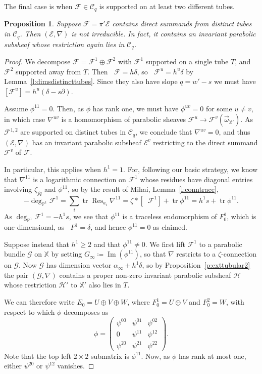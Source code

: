 \documentclass[12pt,a4paper]{amsart}
\theoremstyle{plain}
\newtheorem{prop}[thm]{Proposition}
\newcommand{\PP}{\mathbb P}
\DeclareMathOperator{\tr}{tr}
\DeclareMathOperator{\Ima}{Im}
\DeclareMathOperator{\Res}{Res}
\DeclareMathOperator{\dimv}{\underline\dim}
\newcommand{\F}{\mathcal F}
\newcommand{\E}{\mathcal E}
\newcommand{\G}{\mathcal G}
\newcommand{\CC}{\mathcal C}
\newcommand{\XX}{\mathbb X}
\newcommand{\oom}{\vec{\omega}}
\begin{document}
The final case is when $\F\in\CC_q$ is supported on at least two different tubes.

\begin{prop}
\label{p:exttubular3}
Suppose $\F=\pi'\E$ contains direct summands from distinct tubes in $\CC_q$. Then $(\E,\nabla)$ is not irreducible. In fact, it contains an invariant parabolic subsheaf whose restriction again lies in $\CC_q$.
\end{prop}

\begin{proof}
We decompose $\F=\F^1\oplus\F^2$ with $\F^1$ supported on a single tube $T$, and $\F^2$ supported away from $T$. Then $\dimv\F=h\delta$, so $\dimv\F^u=h^u\delta$ by Lemma~\ref{l:dimsdistincttubes}. Since they also have slope $q=w'-s$ we must have $[\F^u]=h^u(\delta-s\partial)$.

Assume $\phi^{11}=0$. Then, as $\phi$ has rank one, we must have $\phi^{uv}=0$ for some $u\neq v$, in which case $\nabla^{uv}$ is a homomorphism of parabolic sheaves $\F^u\to\F^v(\oom_{\XX'})$. As $\F^{1,2}$ are supported on distinct tubes in $\CC_q$, we conclude that $\nabla^{uv}=0$, and thus $(\E,\nabla)$ has an invariant parabolic subsheaf $\E^v$ restricting to the direct summand $\F^v$ of $\F$.

In particular, this applies when $h^1=1$. For, following our basic strategy, we know that $\nabla^{11}$ is a logarithmic connection on $\F^1$ whose residues have diagonal entries involving $\zeta_{jq}$ and $\phi^{11}$, so by the result of Mihai, Lemma~\ref{l:conntrace},
\[ -\deg_{\PP^1}\F^1 = \sum_i\tr\Res_{a_i}\nabla^{11} = \zeta\ast[\dimv\F^1]+\tr\phi^{11}
= h^1s+\tr\phi^{11}. \]
As $\deg_{\PP^1}\F^1=-h^1s$, we see that $\phi^{11}$ is a traceless endomorphism of $F^1_0$, which is one-dimensional, as $\dimv F^1=\delta$, and hence $\phi^{11}=0$ as claimed.

Suppose instead that $h^1\geq2$ and that $\phi^{11}\neq0$. We first lift $\F^1$ to a parabolic bundle $\G$ on $\XX$ by setting $G_\infty\coloneqq\Ima(\phi^{11})$, so that $\nabla$ restricts to a $\zeta$-connection on $\G$. Now $\G$ has dimension vector $\alpha_\infty+h^1\delta$, so by Proposition~\ref{p:exttubular2} the pair $(\G,\nabla)$ contains a proper non-zero invariant parabolic subsheaf $\mathcal H$ whose restriction $\mathcal H'$ to $\XX'$ also lies in $T$.

We can therefore write $E_0=U\oplus V\oplus W$, where $F^1_0=U\oplus V$ and $F^2_0=W$, with respect to which $\phi$ decomposes as
\[ \phi = \begin{pmatrix}
\psi^{00}&\psi^{01}&\psi^{02}\\
0&\psi^{11}&\psi^{12}\\
\psi^{20}&\psi^{21}&\psi^{22}
\end{pmatrix}. \]
Note that the top left $2\times2$ submatrix is $\phi^{11}$. Now, as $\phi$ has rank at most one, either $\psi^{20}$ or $\psi^{12}$ vanishes.


\end{proof}
\end{document}
